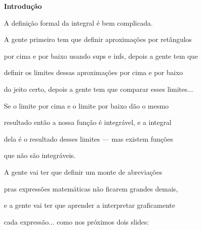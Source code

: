 \documentclass[oneside,12pt]{article}
\begin{document}
\newpage





\unitlength=10pt


\newpage

{\bf Introdução}

A definição formal da integral é bem complicada.

\msk

A gente primeiro tem que definir aproximações por retângulos

por cima e por baixo usando sups e infs, depois a gente tem que

definir os limites dessas aproximações por cima e por baixo

do jeito certo, depois a gente tem que comparar esses limites...

\msk

Se o limite por cima e o limite por baixo dão o mesmo

resultado então a nossa função é integrável, e a integral

dela é o resultado desses limites --- mas existem funções

que não são integráveis.

\msk

A gente vai ter que definir um monte de abreviações

pras expressões matemáticas não ficarem grandes demais,

e a gente vai ter que aprender a interpretar graficamente

cada expressão... como nos próximos dois slides:

\newpage


%
\pu
\end{document}
